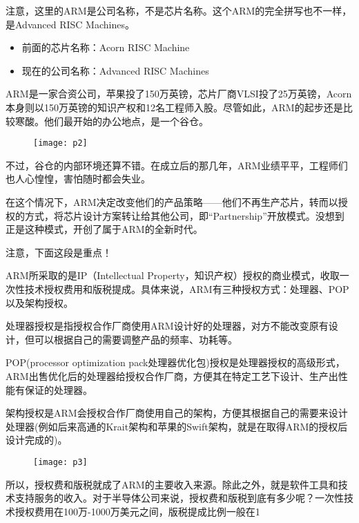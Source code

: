 \documentclass[utf8]{book}
\begin{document}
	注意，这里的ARM是公司名称，不是芯片名称。这个ARM的完全拼写也不一样，是Advanced RISC Machines。
	\begin{itemize}
		\item 前面的芯片名称：Acorn RISC Machine
		\item 现在的公司名称：Advanced RISC Machines
	\end{itemize}

	ARM是一家合资公司，苹果投了150万英镑，芯片厂商VLSI投了25万英镑，Acorn本身则以150万英镑的知识产权和12名工程师入股。尽管如此，ARM的起步还是比较寒酸。他们最开始的办公地点，是一个谷仓。
	
	\begin{figure}[H]
		\centering
		\texttt{[image: p2]}
	\end{figure}

	不过，谷仓的内部环境还算不错。在成立后的那几年，ARM业绩平平，工程师们也人心惶惶，害怕随时都会失业。


	在这个情况下，ARM决定改变他们的产品策略——他们不再生产芯片，转而以授权的方式，将芯片设计方案转让给其他公司，即“Partnership”开放模式。没想到正是这种模式，开创了属于ARM的全新时代。

	{\large 注意，下面这段是重点！}

	ARM所采取的是IP（Intellectual Property，知识产权）授权的商业模式，收取一次性技术授权费用和版税提成。具体来说，ARM有三种授权方式：处理器、POP以及架构授权。

	处理器授权是指授权合作厂商使用ARM设计好的处理器，对方不能改变原有设计，但可以根据自己的需要调整产品的频率、功耗等。

	POP(processor optimization pack处理器优化包)授权是处理器授权的高级形式， ARM出售优化后的处理器给授权合作厂商，方便其在特定工艺下设计、生产出性能有保证的处理器。

	架构授权是ARM会授权合作厂商使用自己的架构，方便其根据自己的需要来设计处理器(例如后来高通的Krait架构和苹果的Swift架构，就是在取得ARM的授权后设计完成的)。

	\begin{figure}[H]
	\centering
	\texttt{[image: p3]}
	\end{figure}

	所以，授权费和版税就成了ARM的主要收入来源。除此之外，就是软件工具和技术支持服务的收入。对于半导体公司来说，授权费和版税到底有多少呢？一次性技术授权费用在100万-1000万美元之间，版税提成比例一般在1%
\end{document}
